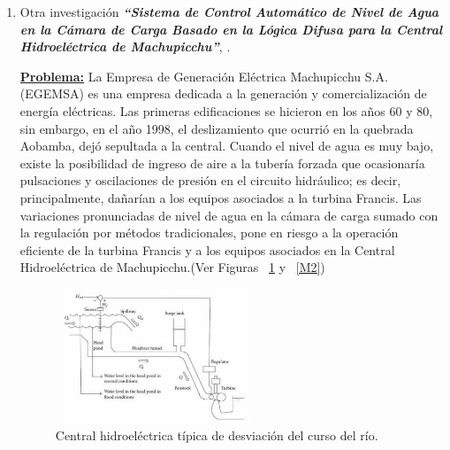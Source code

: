 \documentclass[10pt,conference]{IEEEtran}
\begin{document}
\begin{enumerate}
\textbf{\underline{Importancia:}} 
Las reglas de ajuste de Ziegler-Nichols se desarrollaron para ayudar en el diseño de controladores para sistemas desconocidos; sin embargo, las técnicas también se pueden aplicar a sistemas con funciones de transferencia conocidas. Para demostrar el efecto del supervisor difuso, se implementó el método de Ziegler-Nichols en dos sistemas con funciones de transferencia conocidas. El primer sistema (un sistema de tipo 0) es un brazo flexible de enlace único y el segundo ejemplo (un sistema de tipo 1) es un sistema de servomotor.
\item Otra investigación \textit{\textbf{“Sistema de Control Automático de Nivel de Agua en la Cámara de Carga Basado en la Lógica Difusa para la Central Hidroeléctrica de Machupicchu”}}, \citep{meza2019sistema}.\par
\textbf{\underline{Problema:}} 
La Empresa de Generación Eléctrica Machupicchu S.A. (EGEMSA) es una empresa dedicada a la
generación y comercialización de energía eléctricas. Las primeras edificaciones se hicieron en los años 60 y 80, sin embargo,
en el año 1998, el deslizamiento que ocurrió en la quebrada Aobamba, dejó sepultada a la central. Cuando el nivel de agua es muy bajo, existe la posibilidad de ingreso de aire a la tubería forzada que ocasionaría pulsaciones y oscilaciones de presión en el circuito hidráulico; es decir, principalmente, dañarían a los equipos asociados a la turbina Francis. Las variaciones pronunciadas de nivel de agua en la cámara de carga sumado con la regulación por métodos tradicionales, pone en riesgo a la operación eficiente de la turbina Francis y a los equipos asociados en la Central Hidroeléctrica de Machupicchu.(Ver Figuras ~\ref{M1} y ~\ref{M2})

    \begin{figure}[H]
    \begin{center}
    \includegraphics[width=6cm,height=4cm]{figuras/M1.JPG}
    \caption{Central hidroeléctrica típica de desviación del curso del río.}
    \label{M1} 
    \end{center}
    \end{figure}


\end{enumerate}
\end{document}
